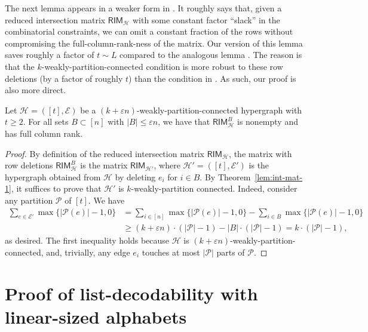 \documentclass{article}[11pt]
\begin{document}
The next lemma appears in a weaker form in \cite{GZ23}.
It roughly says that, given a reduced intersection matrix $\mathsf{RIM}_\mathcal{H}$ with some constant factor ``slack'' in the combinatorial constraints, we can omit a constant fraction of the rows without compromising the full-column-rank-ness of the matrix.
Our version of this lemma saves roughly a factor of $t\sim L$ compared to the analogous lemma \cite[Lemma 3.11]{GZ23}. 
The reason is that the $k$-weakly-partition-connected condition is more robust to these row deletions (by a factor of roughly $t$) than the condition in \cite{GZ23}. As such, our proof is also more direct.
\begin{lemma}
  Let $\mathcal{H}=([t],\mathcal{E})$ be a $(k+\varepsilon n)$-weakly-partition-connected hypergraph with $t \ge 2$.
  For all sets $B\subset[n]$ with $|B|\le \varepsilon n$, we have that $\mathsf{RIM}_{\mathcal{H}}^B$ is nonempty and has full column rank. 
  \label{lem:del}
\end{lemma}
\begin{proof}
  By definition of the reduced intersection matrix $\mathsf{RIM}_\mathcal{H}$, the matrix with row deletions $\mathsf{RIM}_\mathcal{H}^B$ is the matrix $\mathsf{RIM}_{\mathcal{H}'}$, where $\mathcal{H}'=([t],\mathcal{E}')$ is the hypergraph obtained from $\mathcal{H}$  by deleting $e_i$ for $i\in B$.
  By Theorem~\ref{lem:int-mat-1}, it suffices to prove that $\mathcal{H}'$ is $k$-weakly-partition connected.
  Indeed, consider any partition $\mathcal{P}$ of $[t]$.
  We have
  \begin{align}
    \sum_{e\in\mathcal{E}'}{\max\{|\mathcal{P}(e)|-1, 0\}}
    &= \sum_{i\in[n]}{\max\{|\mathcal{P}(e)|-1, 0\}}  - \sum_{i\in B}{\max\{|\mathcal{P}(e)|-1, 0\}} \nonumber\\
    &\ge (k+\varepsilon n)\cdot(|\mathcal{P}|-1)  - |B|\cdot (|\mathcal{P}|-1) 
    = k\cdot(|\mathcal{P}|-1), 
    \label{}
  \end{align}
  as desired.
  The first inequality holds because $\mathcal{H}$ is $(k+\varepsilon n)$-weakly-partition-connected, and, trivially, any edge $e_i$ touches at most $|\mathcal{P}|$ parts of $\mathcal{P}$.
\end{proof}







\section{Proof of list-decodability with linear-sized alphabets}
\label{sec:proof}
\end{document}
